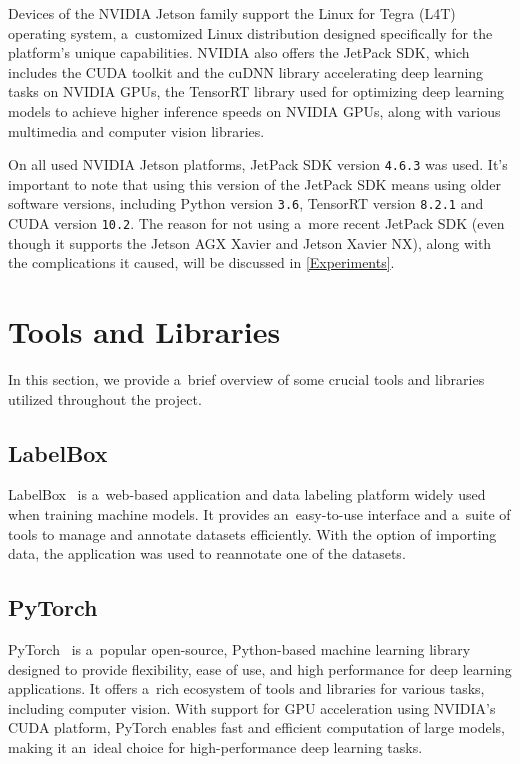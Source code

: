 Devices of the NVIDIA Jetson family support the Linux for Tegra (L4T) operating
system, a~customized Linux distribution designed specifically for the platform's
unique capabilities. NVIDIA also offers the JetPack SDK, which includes the
CUDA toolkit and the cuDNN library accelerating deep learning tasks on NVIDIA
GPUs, the TensorRT library used for optimizing deep learning models to achieve
higher inference speeds on NVIDIA GPUs, along with various multimedia and
computer vision libraries.

On all used NVIDIA Jetson platforms, JetPack SDK version \texttt{4.6.3} was
used. It's important to note that using this version of the JetPack SDK means
using older software versions, including Python version \texttt{3.6}, TensorRT
version \texttt{8.2.1} and CUDA version \texttt{10.2}. The reason for not using
a~more recent JetPack SDK (even though it supports the Jetson AGX Xavier and
Jetson Xavier NX), along with the complications it caused, will be discussed in
\autoref{Experiments}.


\section{Tools and Libraries}

In this section, we provide a~brief overview of some crucial tools and
libraries utilized throughout the project.


\subsection{LabelBox}

LabelBox~\cite{LabelBox} is a~web-based application and data labeling platform
widely used when training machine models. It provides an~easy-to-use interface
and a~suite of tools to manage and annotate datasets efficiently. With the
option of importing data, the application was used to reannotate one of the
datasets.


\subsection{PyTorch}

PyTorch~\cite{PyTorch} is a~popular open-source, Python-based machine learning
library designed to provide flexibility, ease of use, and high performance for
deep learning applications. It offers a~rich ecosystem of tools and libraries for
various tasks, including computer vision. With support for GPU acceleration
using NVIDIA's CUDA platform, PyTorch enables fast and efficient computation of
large models, making it an~ideal choice for high-performance deep learning
tasks.


